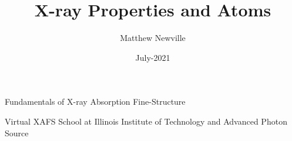 \documentclass[9pt,aspectratio=1610]{beamer}
\begin{document}
\title[Virtual XAFS School]{X-ray Properties and Atoms}
\author[M Newville]{Matthew Newville}
\date{July-2021}


\begin{frame} \titlepage


  \vmm

  \begin{center}

    Fundamentals of X-ray Absorption Fine-Structure

  \end{center}
  
  \vmm

  \begin{cenpage}{60mm}
    

  Virtual XAFS School at Illinois Institute of Technology and Advanced
  Photon Source

\end{cenpage}

\end{frame}




     
\end{document}
